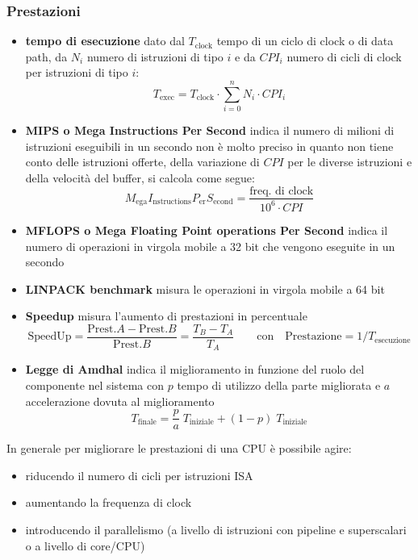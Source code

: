 \documentclass[a4paper]{article}
\begin{document}
\subsubsection*{Prestazioni}
\begin{itemize}
	\item \textbf{tempo di esecuzione} dato dal \(T_\text{clock}\) tempo di un ciclo di clock o di data path, da \(N_i\) numero
	di istruzioni di tipo \(i\) e da \(CPI_i\) numero di cicli di clock per istruzioni di tipo \(i\): \[T_\text{exec} = T_\text{clock} \cdot \sum_{i=0}^{n} N_i \cdot CPI_i\]
	\item \textbf{MIPS o Mega Instructions Per Second} indica il numero di milioni di istruzioni eseguibili in un secondo non è
	molto preciso in quanto non tiene conto delle istruzioni offerte, della variazione di \(CPI\) per le diverse istruzioni e
	della velocità del buffer, si calcola come segue: \[M_\text{ega} I_\text{nstructions} P_\text{er} S_\text{econd} = \frac{\text{freq. di clock}}{10^6 \cdot CPI}\]
	\item \textbf{MFLOPS o Mega Floating Point operations Per Second} indica il numero di operazioni in virgola mobile a 32 bit
	che vengono eseguite in un secondo
	\item \textbf{LINPACK benchmark} misura le operazioni in virgola mobile a 64 bit
	\item \textbf{Speedup} misura l'aumento di prestazioni in percentuale \[\text{SpeedUp} = \frac{\text{Prest.} A - \text{Prest.} B}{\text{Prest.} B} = \frac{T_B - T_A}{T_A} \qquad \text{con} \quad \text{Prestazione} = 1/T_\text{esecuzione}\]
	\item \textbf{Legge di Amdhal} indica il miglioramento in funzione del ruolo del componente nel sistema con \(p\) tempo di 
	utilizzo della parte migliorata e \(a\) accelerazione dovuta al miglioramento \[T_\text{finale} = \frac{p}{a} \; T_\text{iniziale} + (1-p) \; T_\text{iniziale}\]
\end{itemize}
In generale per migliorare le prestazioni di una CPU è possibile agire:
\begin{itemize}
	\item riducendo il numero di cicli per istruzioni ISA
	\item aumentando la frequenza di clock
	\item introducendo il parallelismo (a livello di istruzioni con pipeline e superscalari o a livello di core/CPU)
\end{itemize}


\end{document}
